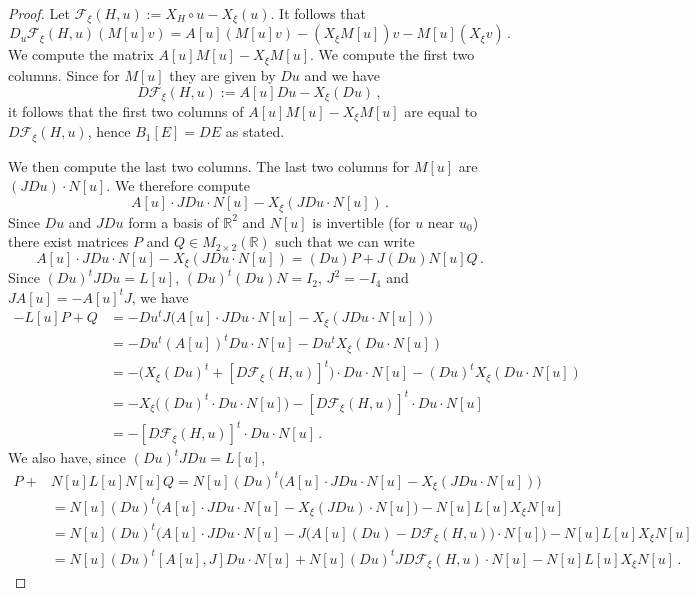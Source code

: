 \documentclass[11pt]{amsart}
\newcommand \R {{ \mathbb R}}
\begin{document}
\begin{proof}
Let $\mathcal{F}_\xi(H, u) := X_H \circ u - X_\xi (u)$. It follows that
$$
D_u \mathcal{F}_\xi(H, u) ( M[u] v) = A[u] (M[u] v) - (X_\xi M[u] ) v -  M[u] (X_\xi v)\,.
$$
We compute the matrix $A[u] M[u] - X_\xi M[u]$.  We compute the first two columns.  Since for $M[u]$ they are given by $Du$ and we have
$$
D\mathcal{F}_\xi(H, u) := A[u] Du - X_\xi (Du)\,,
$$
it follows that the first two columns of $A[u] M[u] - X_\xi M[u]$ are equal to $D\mathcal{F}_\xi(H, u)$, hence $B_1[E]= DE$ as stated.

\medskip
We then compute the last two columns. The last two columns for $M[u]$ are $(JDu) \cdot N[u]$. We therefore compute
$$
A[u]  \cdot J Du \cdot  N[u] -  X_\xi (JDu \cdot N[u])\,.
$$ 
Since $Du$ and $J Du$ form a basis of $\R^2$ and $N[u]$ is invertible (for $u$ near $u_0$) there exist matrices
$P$ and $Q \in M_{2\times 2}(\R)$ such that we can write
$$
A[u]  \cdot J Du \cdot  N[u] -  X_\xi (JDu \cdot N[u]) =  (Du) P  + J (Du) N[u]  Q \,.
$$
Since $ (Du)^t  J Du = L[u]$, $(Du)^t (Du) N =I_2$,  $J^2 =-I_4$ and $ J A[u] = - A[u]^t J$, we have
$$
\begin{aligned}
-L[u] P + Q &= -Du^t  J \Big( A[u]  \cdot J Du \cdot  N[u] -  X_\xi (J Du \cdot N[u]) \Big) \\
&=  - Du^t   (A[u])^t  Du \cdot  N[u]  - Du^t  X_\xi (Du \cdot N[u]) \\
&=  - \Big(  X_\xi (Du)^t + [D\mathcal{F}_\xi(H, u)]^t \Big) \cdot Du \cdot  N[u]  - (Du)^t  X_\xi (Du \cdot N[u]) \\
& = - X_\xi  \Big( (Du)^t  \cdot Du \cdot  N[u] \Big) -   [D\mathcal{F}_\xi(H, u)]^t  \cdot Du \cdot  N[u] \\
&=   - [D\mathcal{F}_\xi(H, u)]^t  \cdot Du \cdot  N[u]\,.
\end{aligned}
$$
We also have, since $ (Du)^t  J Du =L[u]$,
$$
\begin{aligned}
P + &N[u] L[u] N[u] Q=  N[u] (Du)^t \Big( A[u]  \cdot J Du \cdot  N[u] -  X_\xi (J Du \cdot N[u]) \Big) \\
&=  N[u] (Du)^t \Big( A[u]  \cdot J Du \cdot  N[u] -  X_\xi (J Du) \cdot N[u] \Big) - N[u]L[u] X_\xi N[u] \\
&=  N[u] (Du)^t \Big( A[u]  \cdot J Du \cdot  N[u] -     J \Big( A[u](Du)-  D\mathcal{F}_\xi(H, u) \Big)    \cdot N[u] \Big) - N[u]L[u] X_\xi N[u] \\
&= N[u] (Du)^t  [A[u], J]  Du \cdot  N[u]  + N[u] (Du)^t J D\mathcal{F}_\xi(H, u)  \cdot N[u]  - N[u]L[u] X_\xi N[u] \,.
\end{aligned}
$$
\end{proof}
\end{document}
